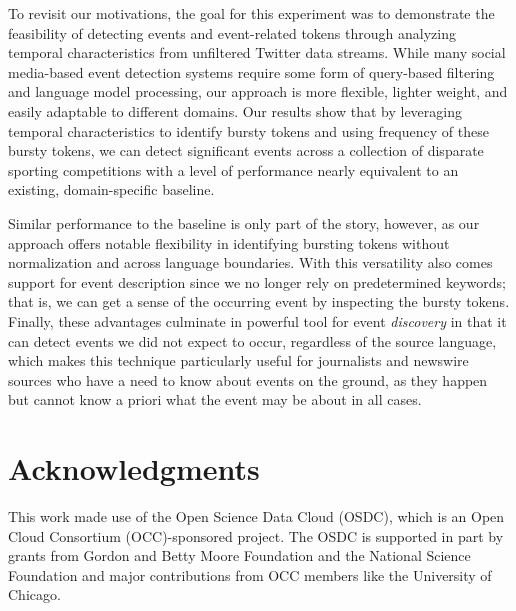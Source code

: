 \documentclass{sig-alternate}
\begin{document}
To revisit our motivations, the goal for this experiment was to demonstrate the feasibility of detecting events and event-related tokens through analyzing temporal characteristics from unfiltered Twitter data streams.
While many social media-based event detection systems require some form of query-based filtering and language model processing, our approach is more flexible, lighter weight, and easily adaptable to different domains.
Our results show that by leveraging temporal characteristics to identify bursty tokens and using frequency of these bursty tokens, we can detect significant events across a collection of disparate sporting competitions with a level of performance nearly equivalent to an existing, domain-specific baseline.

Similar performance to the baseline is only part of the story, however, as our approach offers notable flexibility in identifying bursting tokens without normalization and across language boundaries.
With this versatility also comes support for event description since we no longer rely on predetermined keywords; that is, we can get a sense of the occurring event by inspecting the bursty tokens.
Finally, these advantages culminate in powerful tool for event \emph{discovery} in that it can detect events we did not expect to occur, regardless of the source language, which makes this technique particularly useful for journalists and newswire sources who have a need to know about events on the ground, as they happen but cannot know a priori what the event may be about in all cases.


\section{Acknowledgments}
This work made use of the Open Science Data Cloud (OSDC), which is an Open Cloud Consortium (OCC)-sponsored project. 
The OSDC is supported in part by grants from Gordon and Betty Moore Foundation and the National Science Foundation and major contributions from OCC members like the University of Chicago. 

%

%
%
\end{document}
